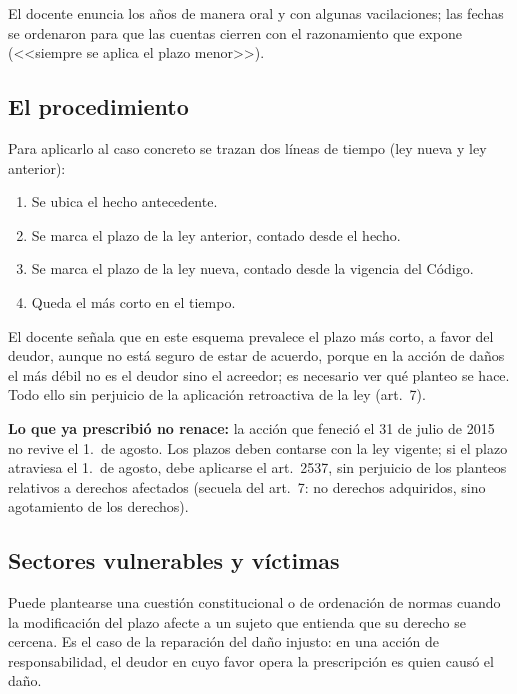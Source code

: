 \documentclass[12pt,oneside]{book}
\begin{document}
\begin{note}
El docente enuncia los a\~nos de manera oral y con algunas vacilaciones; las fechas se ordenaron para que las cuentas cierren con el razonamiento que expone (<<siempre se aplica el plazo menor>>).
\end{note}

\subsection{El procedimiento}

Para aplicarlo al caso concreto se trazan dos l\'ineas de tiempo (ley nueva y ley anterior):
\begin{enumerate}
  \item Se ubica el hecho antecedente.
  \item Se marca el plazo de la ley anterior, contado desde el hecho.
  \item Se marca el plazo de la ley nueva, contado desde la vigencia del C\'odigo.
  \item Queda el m\'as corto en el tiempo.
\end{enumerate}

El docente se\~nala que en este esquema prevalece el plazo m\'as corto, a favor del deudor, aunque no est\'a seguro de estar de acuerdo, porque en la acci\'on de da\~nos el m\'as d\'ebil no es el deudor sino el acreedor; es necesario ver qu\'e planteo se hace. Todo ello sin perjuicio de la aplicaci\'on retroactiva de la ley (art.\ 7).

\begin{important}
\textbf{Lo que ya prescribi\'o no renace:} la acci\'on que feneci\'o el 31 de julio de 2015 no revive el 1.\textordmasculine\ de agosto. Los plazos deben contarse con la ley vigente; si el plazo atraviesa el 1.\textordmasculine\ de agosto, debe aplicarse el art.\ 2537, sin perjuicio de los planteos relativos a derechos afectados (secuela del art.\ 7: no derechos adquiridos, sino agotamiento de los derechos).
\end{important}

\subsection{Sectores vulnerables y v\'ictimas}

Puede plantearse una cuesti\'on constitucional o de ordenaci\'on de normas cuando la modificaci\'on del plazo afecte a un sujeto que entienda que su derecho se cercena. Es el caso de la reparaci\'on del da\~no injusto: en una acci\'on de responsabilidad, el deudor en cuyo favor opera la prescripci\'on es quien caus\'o el da\~no.
\end{document}
